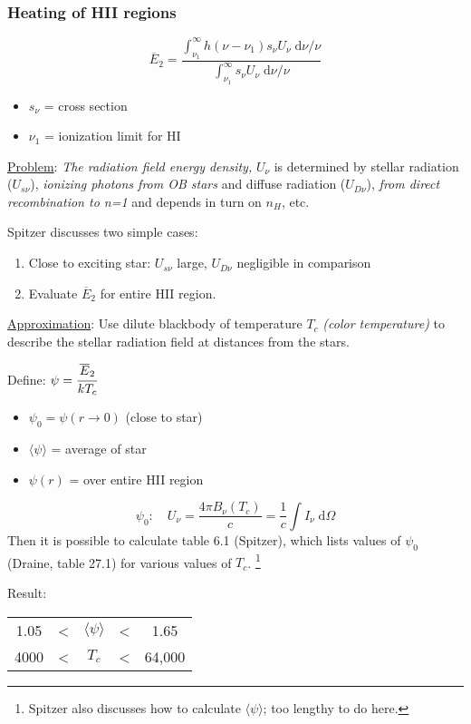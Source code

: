 \documentclass[11pt]{article}
\newcommand{\mar}[1]{\hspace{0pt}\marginpar{-\textcolor{black}{#1}-}}
\newcommand{\mynotes}[1]{{\fontfamily{cmss}\selectfont \textit{#1}}}
\begin{document}
\subsubsection{Heating of HII regions}
\[
    \overline{E}_{2} = \frac{
        \int_{\nu_{1}}^{\infty}{
            h(\nu-\nu_{1})s_{\nu}U_{\nu}\;\mathrm{d}\nu/\nu}}{
        \int_{\nu_{1}}^{\infty}{
            s_{\nu}U_{\nu}\;\mathrm{d}\nu/\nu}}
    \]
\begin{itemize}
    \item $s_{\nu}$ = cross section
    \item $\nu_{1}$ = ionization limit for HI
\end{itemize}

\underline{Problem}:
\mynotes{The radiation field energy density,} $U_{\nu}$ is determined by
stellar radiation ($U_{s\nu}$), \mynotes{ionizing photons from OB stars} and
diffuse radiation ($U_{D\nu}$), \mynotes{from direct recombination to n=1} and
depends in turn on $n_{H}$, etc.

Spitzer discusses two simple cases:
\begin{enumerate}
    \item Close to exciting star: $U_{s\nu}$ large, $U_{D\nu}$ negligible
        in comparison
    \item Evaluate $\overline{E}_{2}$ for entire HII region.
\end{enumerate}
\underline{Approximation}:
Use dilute blackbody of temperature $T_{c}$ \mynotes{(color temperature)}
to describe the stellar radiation field at distances from the stars.

Define: $\psi = \cfrac{\overline{E}_{2}}{kT_{c}}$
\begin{itemize}
    \item $\psi_{0} = \psi(r\rightarrow 0)$ (close to star)
    \item $ \langle \psi \rangle $ = average of star
    \item $\psi(r)$ = over entire HII region
\end{itemize}

\mar{155}
\[
    \psi_{0}:\quad U_{\nu} = \frac{4 \pi B_{\nu} (T_{c})}{c}
    = \frac{1}{c}\int{I_{\nu} \;\mathrm{d}\Omega}
    \]
Then it is possible to calculate table 6.1 (Spitzer), which lists values of
$\psi_{0}$ (Draine, table 27.1) for various values of $T_{c}$. \footnote{
    Spitzer also discusses how to calculate $ \langle \psi \rangle $; too lengthy to do here.
}

Result:
\begin{tabular}{c c c c c}
    1.05 & \textless & $ \langle \psi \rangle $ & \textless & 1.65\\
    4000 & \textless & $T_{c}$ & \textless & 64,000\\
\end{tabular}
\end{document}
